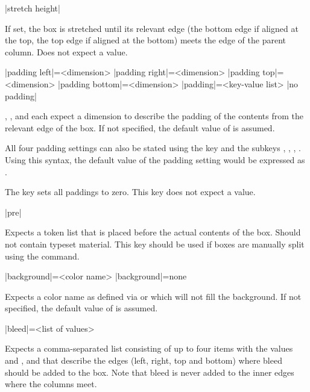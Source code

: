 \documentclass[a4paper]{article}
\begin{document}
\begin{macrodef}
|stretch height|
\end{macrodef}
If set, the box is stretched until its relevant edge (the bottom edge if aligned at the top, the top edge if aligned at the bottom) meets the edge of the parent column. Does not expect a value.

\begin{macrodef}
|padding left|={<dimension>}
|padding right|={<dimension>}
|padding top|={<dimension>}
|padding bottom|={<dimension>}
|padding|={<key-value list>}
|no padding|
\end{macrodef}
, ,  and  each expect a dimension to describe the padding of the contents from the relevant edge of the box. If not specified, the default value of \macro{7.5mm} is assumed.

All four padding settings can also be stated using the  key and the subkeys , , , . Using this syntax, the default value of the padding setting would be expressed as .

The key  sets all paddings to zero. This key does not expect a value.

\begin{macrodef}
|pre| 
\end{macrodef}
Expects a token list that is placed before the actual contents of the box. Should not contain typeset material. This key should be used if boxes are manually split using the \macro{\leporelloboxbreak} command.

\begin{macrodef}
|background|={<color name>}
|background|={none}
\end{macrodef}
Expects a color name as defined via  or  which will not fill the background. If not specified, the default value of  is assumed.

\begin{macrodef}
|bleed|={<list of values>}
\end{macrodef}
Expects a comma-separated list consisting of up to four items with the values  and ,  and  that describe the edges (left, right, top and bottom) where bleed should be added to the box. Note that bleed is never added to the inner edges where the columns meet.
\end{document}
